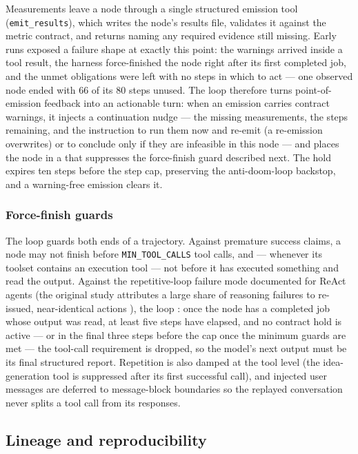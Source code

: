 Measurements leave a node through a single structured emission tool
(\texttt{emit\_results}), which writes the node's results file,
validates it against the metric contract, and returns  naming any required evidence still missing. Early runs
exposed a failure shape at exactly this point: the warnings arrived
inside a tool result, the harness force-finished the node right after
its first completed job, and the unmet obligations were left with no
steps in which to act --- one observed node ended with 66 of its 80
steps unused. The loop therefore turns point-of-emission feedback
into an actionable turn: when an emission carries contract warnings,
it injects a continuation nudge --- the missing measurements, the
steps remaining, and the instruction to run them now and re-emit (a
re-emission overwrites) or to conclude only if they are infeasible in
this node --- and places the node in a  that
suppresses the force-finish guard described next. The hold expires
ten steps before the step cap, preserving the anti-doom-loop
backstop, and a warning-free emission clears it.

\subsubsection*{Force-finish guards}

The loop guards both ends of a trajectory. Against premature success
claims, a node may not finish before \texttt{MIN\_TOOL\_CALLS} tool
calls, and --- whenever its toolset contains an execution tool ---
not before it has executed something and read the output. Against the
repetitive-loop failure mode documented for ReAct agents (the
original study attributes a large share of reasoning failures to
re-issued, near-identical actions \cite{yao2023react}), the loop
: once the node has a completed job whose output
was read, at least five steps have elapsed, and no contract hold is
active --- or in the final three steps before the cap once the
minimum guards are met --- the tool-call requirement is dropped, so
the model's next output must be its final structured report.
Repetition is also damped at the tool level (the idea-generation tool
is suppressed after its first successful call), and injected user
messages are deferred to message-block boundaries so the replayed
conversation never splits a tool call from its responses.

\subsection{Lineage and reproducibility}\label{sec:exploration:lineage}


